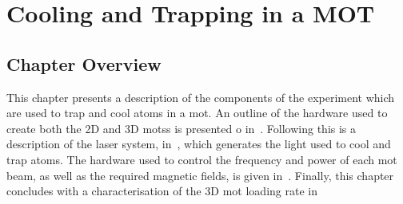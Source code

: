 \chapter{Cooling and Trapping in a MOT}\label{chap:mot}
\section{Chapter Overview}
This chapter presents a description of the components of the experiment which
are used to trap and cool atoms in a \ac{mot}. An outline of the hardware used
to create both the 2D and 3D \acp{mots} is presented
o
in~. Following this is a description of the
\Muquans laser system, in~, which generates the
light used to cool and trap atoms. The hardware used to control the frequency
and power of each \ac{mot} beam, as well as the required magnetic fields, is
given in~. Finally, this chapter concludes with a
characterisation of the 3D \ac{mot} loading rate in~
